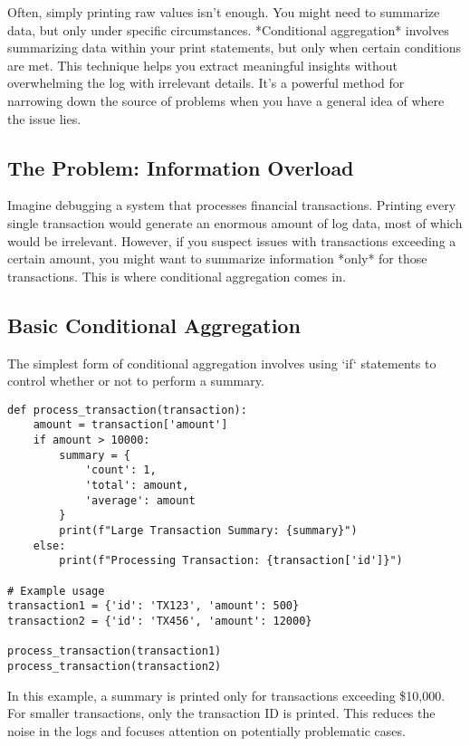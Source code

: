 \documentclass{article}
\begin{document}
{{{Often, simply printing raw values isn't enough. You might need to summarize data, but only under specific circumstances. *Conditional aggregation* involves summarizing data within your print statements, but only when certain conditions are met. This technique helps you extract meaningful insights without overwhelming the log with irrelevant details. It's a powerful method for narrowing down the source of problems when you have a general idea of where the issue lies.

\subsection*{The Problem: Information Overload}

Imagine debugging a system that processes financial transactions. Printing every single transaction would generate an enormous amount of log data, most of which would be irrelevant. However, if you suspect issues with transactions exceeding a certain amount, you might want to summarize information *only* for those transactions. This is where conditional aggregation comes in.

\subsection*{Basic Conditional Aggregation}

The simplest form of conditional aggregation involves using `if` statements to control whether or not to perform a summary.

\begin{verbatim}
def process_transaction(transaction):
    amount = transaction['amount']
    if amount > 10000:
        summary = {
            'count': 1,
            'total': amount,
            'average': amount
        }
        print(f"Large Transaction Summary: {summary}")
    else:
        print(f"Processing Transaction: {transaction['id']}")

# Example usage
transaction1 = {'id': 'TX123', 'amount': 500}
transaction2 = {'id': 'TX456', 'amount': 12000}

process_transaction(transaction1)
process_transaction(transaction2)
\end{verbatim}

In this example, a summary is printed only for transactions exceeding \$10,000. For smaller transactions, only the transaction ID is printed. This reduces the noise in the logs and focuses attention on potentially problematic cases.

}}}
\end{document}
